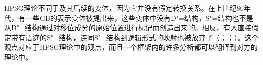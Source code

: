 HPSG理论不同于\gbtc 及其后续的变体，因为它并没有假定转换关系。在上世纪80年代，有一些GB的表示变体被提出来，这些变体中没有D"=结构，S"=结构也不是从D"=结构通过对移位成分的原始位置进行标记而创造出来的。相反，有人直接假定带有语迹的S"=结构，连同S"=结构到逻辑形式的映射也被放弃了（\citealp{Koster78b-u}；\citealp[\S~1.4]{Haider93a}；\citealp[]{Frey93a}）。这个观点对应于HPSG理论中的观点，而且一个框架内的许多分析都可以翻译到对方的理论中。

